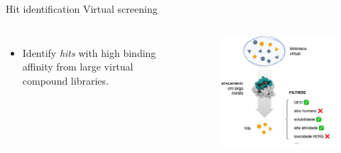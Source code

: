 \documentclass[aspectratio=169,xcolor=dvipsnames]{beamer}
\begin{document}
\begin{frame}{Hit identification \hfill Virtual screening}
    \begin{columns}[c]
        \begin{itemize}
            \item Identify \textit{hits} with high binding affinity from large virtual compound libraries.
        \end{itemize}

        \begin{figure}
            \centering
            \includegraphics[width=0.95\linewidth]{imgs/virtual-screening.png}
        \end{figure}
    \end{columns}
\end{frame}
\end{document}
